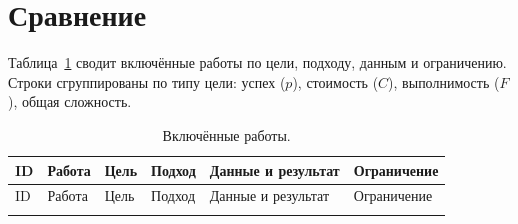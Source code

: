 \documentclass[11pt,a4paper]{article}
\begin{document}
\section{Сравнение}

Таблица~\ref{tab:sources} сводит включённые работы по цели, подходу, данным и
ограничению. Строки сгруппированы по типу цели: успех ($p$), стоимость
($C$), выполнимость ($F$), общая сложность.

{\footnotesize
\setlength{\tabcolsep}{3pt}
\renewcommand{\arraystretch}{1.15}
\begin{longtable}{@{}p{0.7cm}p{3.0cm}p{2.2cm}p{3.1cm}p{3.5cm}p{2.3cm}@{}}
\caption{Включённые работы.}\label{tab:sources}\\
\toprule
ID & Работа & Цель & Подход & Данные и результат & Ограничение \\
\midrule
\endfirsthead
\toprule
ID & Работа & Цель & Подход & Данные и результат & Ограничение \\
\midrule
\endhead
\bottomrule
\endfoot


\end{longtable}}
\end{document}
